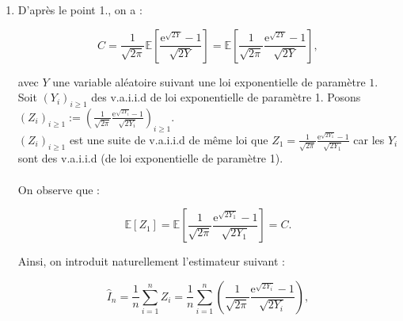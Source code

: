 \documentclass{article}
\theoremstyle{exostyle}
\newenvironment{questions}{
\begin{enumerate}[\hspace{12pt} 1.]}{\end{enumerate}}
\begin{document}
\begin{questions}
On sait que pour $x$ petit on a $\text{e}^{x}-1 \sim x$. Donc $\frac{\text{e}^{\sqrt{2y}}-1}{\sqrt{2y}} \text{e}^{-y} \underset{y \to 0}{\sim} \text{e}^{-y}$. Ainsi, il n'y a aucun problème en $0$.\\

On a donc : 

\begin{align*}
    C &= \frac{1}{\sqrt{2\pi}} \int_{0}^{+\infty} \frac{\text{e}^{\sqrt{2y}}-1}{\sqrt{2y}} f_{Y}(y)dy\\
    &= \frac{1}{\sqrt{2\pi}} \int_{\mathbb{R}} \frac{\text{e}^{\sqrt{2y}}-1}{\sqrt{2y}} f_{Y}(y) \mathds{1}_{[0,+\infty[}(x)dy\\
    &= \frac{1}{\sqrt{2\pi}} \mathbb{E}\left[ \frac{\text{e}^{\sqrt{2Y}}-1}{\sqrt{2Y}} \right],
\end{align*}
    
où le passage de la deuxième à la troisème ligne est justifié par l'utilisation du théorème de transfert.

\bigbreak
\bigbreak

\item D'après le point 1., on a : 

\[C = \frac{1}{\sqrt{2\pi}} \mathbb{E}\left[ \frac{\text{e}^{\sqrt{2Y}}-1}{\sqrt{2Y}} \right] = \mathbb{E}\left[ \frac{1}{\sqrt{2\pi}} \frac{\text{e}^{\sqrt{2Y}}-1}{\sqrt{2Y}} \right],\]

avec $Y$ une variable aléatoire suivant une loi exponentielle de paramètre $1$.\\
Soit $(Y_{i})_{i \geq 1}$ des v.a.i.i.d de loi exponentielle de paramètre 1. Posons $(Z_{i})_{i \geq 1} := \left( \frac{1}{\sqrt{2\pi}} \frac{\text{e}^{\sqrt{2Y_{i}}}-1}{\sqrt{2Y_{i}}} \right)_{i \geq 1}$.\\
$(Z_{i})_{i \geq 1}$ est une suite de v.a.i.i.d de même loi que $Z_{1} =  \frac{1}{\sqrt{2\pi}} \frac{\text{e}^{\sqrt{2Y_{1}}}-1}{\sqrt{2Y_{1}}}$ car les $Y_{i}$ sont des v.a.i.i.d (de loi exponentielle de paramètre 1).\\
\\

On observe que : 

\[\mathbb{E} [Z_{1}] = \mathbb{E} \left[ \frac{1}{\sqrt{2\pi}} \frac{\text{e}^{\sqrt{2Y_{1}}}-1}{\sqrt{2Y_{1}}} \right] = C.\]

Ainsi, on introduit naturellement l'estimateur suivant :

\[\hat{I}_{n} = \frac{1}{n} \sum_{i=1}^{n} Z_{i} = \frac{1}{n} \sum_{i=1}^{n} \left( \frac{1}{\sqrt{2\pi}} \frac{\text{e}^{\sqrt{2Y_{i}}}-1}{\sqrt{2Y_{i}}} \right),\]


\end{questions}
\end{document}
